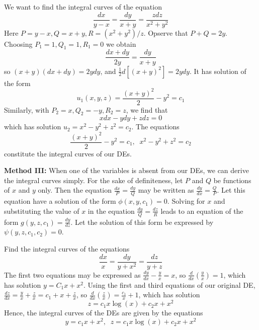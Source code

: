     \begin{example}
        We want to find the integral curves of the equation \begin{equation*}
            \frac{dx}{y-x} = \frac{dy}{x+y}=\frac{zdz}{x^2+y^2}
        \end{equation*}
        Here $P = y-x, Q = x+y, R = (x^2+y^2)/z$. Opserve that $P+Q = 2y$. Choosing $P_1 = 1,Q_1 = 1, R_1 = 0$ we obtain \begin{equation*}
            \frac{dx+dy}{2y} = \frac{dy}{x+y}
        \end{equation*}
        so $(x+y)(dx+dy) = 2ydy$, and $\frac{1}{2}d[(x+y)^2] = 2ydy$. It has solution of the form \begin{equation*}
            u_1(x,y,z) = \frac{(x+y)^2}{2} - y^2 = c_1
        \end{equation*}
        Similarly, with $P_2 = x,Q_2 = -y,R_2 = z$, we find that \begin{equation*}
            xdx-ydy+zdz = 0
        \end{equation*}
        which has solution $u_2 = x^2-y^2+z^2 = c_2$. The equations \begin{equation*}
            \frac{(x+y)^2}{2}-y^2=c_1,\;\;x^2-y^2+z^2 = c_2
        \end{equation*}
        constitute the integral curves of our DEs.
    \end{example}


    \textbf{Method III:} When one of the variables is absent from our DEs, we can derive the integral curves simply. For the sake of definiteness, let $P$ and $Q$ be functions of $x$ and $y$ only. Then the equation $\frac{dx}{P} = \frac{dy}{Q}$ may be written as $\frac{dy}{dx} = \frac{Q}{P}$. Let this equation have a solution of the form $\phi(x,y,c_1) = 0$. Solving for $x$ and substituting the value of $x$ in the equation $\frac{dy}{Q} = \frac{dz}{R}$ leads to an equation of the form $g(y,z,c_1) = \frac{dy}{dz}$. Let the solution of this form be expressed by $\psi(y,z,c_1,c_2) = 0$.

    \begin{example}
        Find the integral curves of the equations \begin{equation*}
            \frac{dx}{x} = \frac{dy}{y+x^2} = \frac{dz}{y+z}
        \end{equation*}
        The first two equations may be expressed as $\frac{dy}{dx}-\frac{y}{x} = x$, so $\frac{d}{dx}\left(\frac{y}{x}\right) = 1$, which has solution $y = C_1x+x^2$. Using the first and third equations of our original DE, $\frac{dz}{dx} = \frac{y}{x}+\frac{z}{x} =c_1+x+\frac{z}{x}$, so $\frac{d}{dx}\left(\frac{z}{x}\right) = \frac{c_1}{x}+1$, which has solution \begin{equation*}
            z = c_1x\log(x) + c_2 x + x^2
        \end{equation*}
        Hence, the integral curves of the DEs are given by the equations \begin{equation*}
            y = c_1x+x^2,\;\;z=c_1x\log(x)+c_2x+x^2
        \end{equation*}
    \end{example}